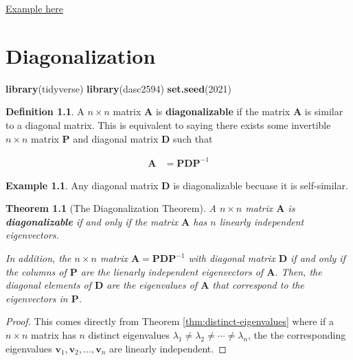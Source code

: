 \documentclass[
]{book}
\newenvironment{Shaded}{\begin{snugshade}}{\end{snugshade}}
\newcommand{\DecValTok}[1]{\textcolor[rgb]{0.00,0.00,0.81}{#1}}
\newcommand{\KeywordTok}[1]{\textcolor[rgb]{0.13,0.29,0.53}{\textbf{#1}}}
\newcommand{\NormalTok}[1]{#1}
\newtheorem{theorem}{Theorem}[chapter]
\theoremstyle{definition}
\newtheorem{definition}{Definition}[chapter]
\theoremstyle{definition}
\newtheorem{example}{Example}[chapter]
\theoremstyle{definition}
\theoremstyle{definition}
\theoremstyle{remark}
\begin{document}
\href{https://textbooks.math.gatech.edu/ila/similarity.html}{Example here}

\hypertarget{diagonalization}{%
\chapter{Diagonalization}\label{diagonalization}}

\begin{Shaded}
\begin{Highlighting}[]
\KeywordTok{library}\NormalTok{(tidyverse)}
\KeywordTok{library}\NormalTok{(dasc2594)}
\KeywordTok{set.seed}\NormalTok{(}\DecValTok{2021}\NormalTok{)}
\end{Highlighting}
\end{Shaded}

\begin{definition}
A \(n \times n\) matrix \(\mathbf{A}\) is \textbf{diagonalizable} if the matrix \(\mathbf{A}\) is similar to a diagonal matrix. This is equivalent to saying there exists some invertible \(n \times n\) matrix \(\mathbf{P}\) and diagonal matrix \(\mathbf{D}\) such that

\[
\begin{aligned}
\mathbf{A} & = \mathbf{P} \mathbf{D} \mathbf{P}^{-1}
\end{aligned}
\]
\end{definition}

\begin{example}
Any diagonal matrix \(\mathbf{D}\) is diagonalizable becuase it is self-similar.
\end{example}

\begin{theorem}[The Diagonalization Theorem]
\protect\hypertarget{thm:diagonalization}{}\label{thm:diagonalization}A \(n \times n\) matrix \(\mathbf{A}\) is \textbf{diagonalizable} if and only if the matrix \(\mathbf{A}\) has \(n\) linearly independent eigenvectors.

In addition, the \(n \times n\) matrix \(\mathbf{A} = \mathbf{P} \mathbf{D} \mathbf{P}^{-1}\) with diagonal matrix \(\mathbf{D}\) if and only if the columns of \(\mathbf{P}\) are the lienarly independent eigenvectors of \(\mathbf{A}\). Then, the diagonal elements of \(\mathbf{D}\) are the eigenvalues of \(\mathbf{A}\) that correspond to the eigenvectors in \(\mathbf{P}\).
\end{theorem}

\begin{proof}
This comes directly from Theorem \ref{thm:distinct-eigenvalues} where if a \(n \times n\) matrix has \(n\) distinct eigenvalues \(\lambda_1 \neq \lambda_2 \neq \cdots \neq \lambda_n\), the the corresponding eigenvalues \(\mathbf{v}_1, \mathbf{v}_2, \ldots, \mathbf{v}_n\) are linearly independent.
\end{proof}
\end{document}
